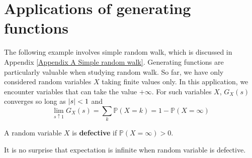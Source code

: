 \documentclass{huhtakm-template-book}
\newcommand{\prob}{\mathbb{P}}
\begin{document}
\section{Applications of generating functions}
The following example involves simple random walk, which is discussed in Appendix \ref{Appendix A Simple random walk}. Generating functions are particularly valuable when studying random walk. So far, we have only considered random variables $X$ taking finite values only. In this application, we encounter variables that can take the value $+\infty$. For such variables $X$, $G_{X}(s)$ converges so long as $\left|{s}\right|<1$ and
\begin{equation*}
	\lim_{s\uparrow 1}G_{X}(s)=\sum_{k}\prob(X=k)=1-\prob(X=\infty)
\end{equation*}
\begin{defn}
	A random variable $X$ is \textbf{defective} if $\prob(X=\infty)>0$.
\end{defn}
\begin{rem}
	It is no surprise that expectation is infinite when random variable is defective.
\end{rem}
\end{document}
